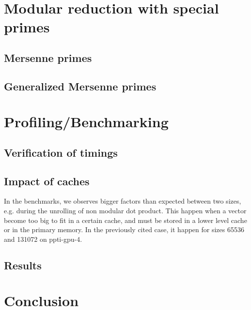 \documentclass[a4paper]{article}
\begin{document}
\section{Modular reduction with special primes}

\subsection{Mersenne primes}


\subsection{Generalized Mersenne primes}


\section{Profiling/Benchmarking}



\subsection{Verification of timings}

\subsection{Impact of caches} %

In the benchmarks, we observes bigger factors than expected between two sizes,
e.g. during the unrolling of non modular dot product. This happen when a vector
become too big to fit in a certain cache, and must be stored in a lower level
cache or in the primary memory. In the previously cited case, it happen for sizes
65536 and 131072 on ppti-gpu-4. %


\subsection{Results}

\section{Conclusion}



\newpage
 
 
\nocite{*}
\end{document}
